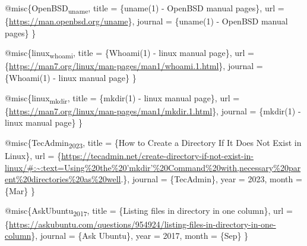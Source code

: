 \documentclass[11pt]{article}
\author{Galindo}
\date{\today}
\title{}
\begin{document}
\tableofcontents

@misc\{OpenBSD\textsubscript{uname},
  title =        \{uname(1) - OpenBSD manual pages\},
  url =          \{\url{https://man.openbsd.org/uname}\},
  journal =      \{uname(1) - OpenBSD manual pages\}
\}

@misc\{linux\textsubscript{whoami},
  title =        \{Whoami(1) - linux manual page\},
  url =          \{\url{https://man7.org/linux/man-pages/man1/whoami.1.html}\},
  journal =      \{Whoami(1) - linux manual page\}
\}

@misc\{linux\textsubscript{mkdir},
  title =        \{mkdir(1) - linux manual page\},
  url =          \{\url{https://man7.org/linux/man-pages/man1/mkdir.1.html}\},
  journal =      \{mkdir(1) - linux manual page\}
\}

@misc\{TecAdmin\textsubscript{2023},
  title =        \{How to Create a Directory If It Does Not Exist in Linux\},
  url =          \{\url{https://tecadmin.net/create-directory-if-not-exist-in-linux/\#:\~:text=Using\%20the\%20’mkdir’\%20Command\%20with,necessary\%20parent\%20directories\%20as\%20well}.\},
  journal =      \{TecAdmin\},
  year =         2023,
  month =        \{Mar\}
\}

@misc\{AskUbuntu\textsubscript{2017},
  title =        \{Listing files in directory in one column\},
  url =          \{\url{https://askubuntu.com/questions/954924/listing-files-in-directory-in-one-column}\},
  journal =      \{Ask Ubuntu\},
  year =         2017,
  month =        \{Sep\}
\}
\end{document}
